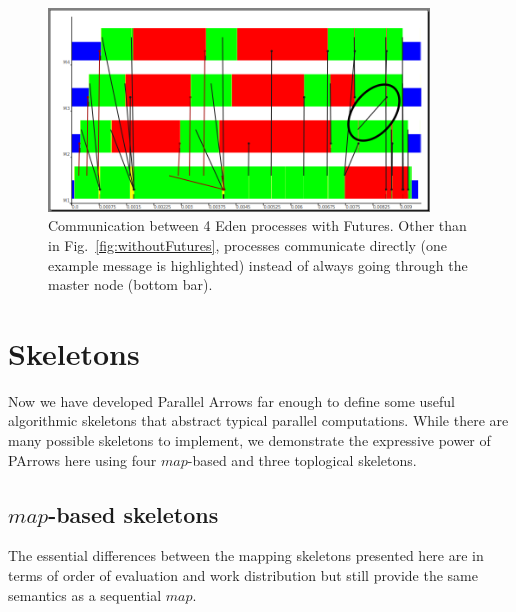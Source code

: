 \documentclass{jfp1}
\newcommand{\Varid}[1]{\mathit{#1}}
\begin{document}
\begin{figure}[ht]
	\centering
	\includegraphics[width=0.9\textwidth]{images/withFutures}
	\caption[with Futures]{Communication between 4 Eden processes with Futures. Other than in Fig.~\ref{fig:withoutFutures}, processes communicate directly (one example message is highlighted) instead of always going through the master node (bottom bar).}
	\label{fig:withFutures}
\end{figure}
	\section{Skeletons}
\label{sec:skeletons}
Now we have developed Parallel Arrows far enough to define some useful algorithmic skeletons that abstract typical parallel computations. While there are many possible skeletons to implement, we demonstrate the expressive power of PArrows here using four \ensuremath{\Varid{map}}-based and three toplogical skeletons.
\subsection{\ensuremath{\Varid{map}}-based skeletons}
\label{sec:map-skeletons}
The essential differences between the mapping skeletons presented here are in terms of order of evaluation and work distribution but still provide the same semantics as a sequential \ensuremath{\Varid{map}}.
\end{document}
